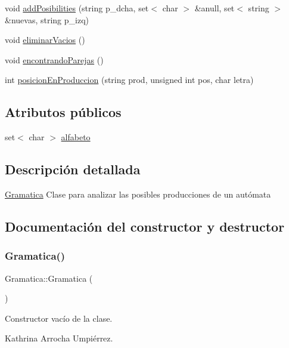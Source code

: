 \begin{DoxyCompactItemize}
\item 
void \hyperlink{class_gramatica_af737553fd6620c33fbc98f89f2aafb3f}{add\+Posibilities} (string p\+\_\+dcha, set$<$ char $>$ \&anull, set$<$ string $>$ \&nuevas, string p\+\_\+izq)
\item 
void \hyperlink{class_gramatica_ab457a99cd09de77d53952a6627d79c18}{eliminar\+Vacios} ()
\item 
void \hyperlink{class_gramatica_a3698e12aeff2c571d43e38ecc7ae655f}{encontrando\+Parejas} ()
\item 
int \hyperlink{class_gramatica_a9dacf4c02a20d948c12b8a24df001939}{posicion\+En\+Produccion} (string prod, unsigned int pos, char letra)
\end{DoxyCompactItemize}
\subsection*{Atributos públicos}
\begin{DoxyCompactItemize}
\item 
set$<$ char $>$ \hyperlink{class_gramatica_a538ac9ed9a10b67ab206402b326e787e}{alfabeto}
\end{DoxyCompactItemize}


\subsection{Descripción detallada}
\hyperlink{class_gramatica}{Gramatica}  Clase para analizar las posibles producciones de un autómata 

\subsection{Documentación del constructor y destructor}
\mbox{\label{class_gramatica_a22ad135e5e5fc60820c26b0c4085cef7}} 
\subsubsection{\texorpdfstring{Gramatica()}{Gramatica()}}
{\footnotesize\ttfamily Gramatica\+::\+Gramatica (\begin{DoxyParamCaption}{ }\end{DoxyParamCaption})}

Constructor vacío de la clase.

Kathrina Arrocha Umpiérrez.

